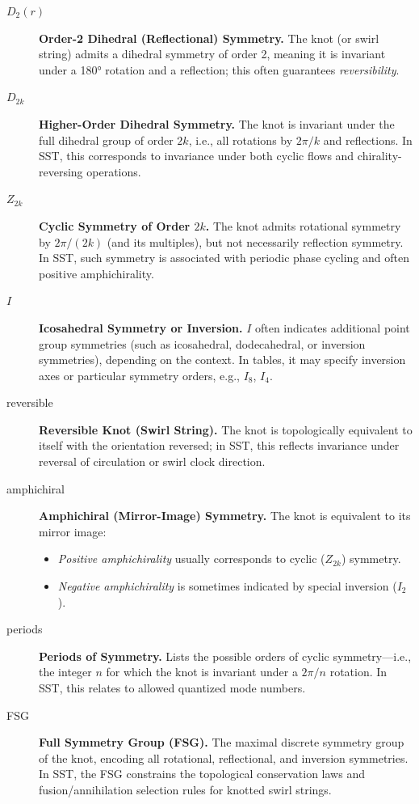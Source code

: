 \documentclass[10pt,reprint,aps,onecolumn,nofootinbib]{revtex4-2}
\begin{document}
        \begin{description}
            \item[\( D_2(r) \)] \textbf{Order-2 Dihedral (Reflectional) Symmetry.}
            The knot (or swirl string) admits a dihedral symmetry of order 2, meaning it is invariant under a 180° rotation and a reflection; this often guarantees \emph{reversibility}.

            \item[\( D_{2k} \)] \textbf{Higher-Order Dihedral Symmetry.}
            The knot is invariant under the full dihedral group of order \( 2k \), i.e., all rotations by \( 2\pi/k \) and reflections. In SST, this corresponds to invariance under both cyclic flows and chirality-reversing operations.

            \item[\( Z_{2k} \)] \textbf{Cyclic Symmetry of Order \( 2k \).}
            The knot admits rotational symmetry by \( 2\pi/(2k) \) (and its multiples), but not necessarily reflection symmetry. In SST, such symmetry is associated with periodic phase cycling and often positive amphichirality.

            \item[\( I \)] \textbf{Icosahedral Symmetry or Inversion.}
            \( I \) often indicates additional point group symmetries (such as icosahedral, dodecahedral, or inversion symmetries), depending on the context. In tables, it may specify inversion axes or particular symmetry orders, e.g., \( I_8 \), \( I_4 \).

            \item[reversible] \textbf{Reversible Knot (Swirl String).}
            The knot is topologically equivalent to itself with the orientation reversed; in SST, this reflects invariance under reversal of circulation or swirl clock direction.

            \item[amphichiral] \textbf{Amphichiral (Mirror-Image) Symmetry.}
            The knot is equivalent to its mirror image:
            \begin{itemize}\item \emph{Positive amphichirality} usually corresponds to cyclic (\( Z_{2k} \)) symmetry.
            \item \emph{Negative amphichirality} is sometimes indicated by special inversion (\( I_2 \)).
            \end{itemize}

            \item[periods] \textbf{Periods of Symmetry.}
            Lists the possible orders of cyclic symmetry—i.e., the integer \( n \) for which the knot is invariant under a \( 2\pi/n \) rotation. In SST, this relates to allowed quantized mode numbers.

            \item[FSG] \textbf{Full Symmetry Group (FSG).}
            The maximal discrete symmetry group of the knot, encoding all rotational, reflectional, and inversion symmetries. In SST, the FSG constrains the topological conservation laws and fusion/annihilation selection rules for knotted swirl strings.
        \end{description}
\end{document}
